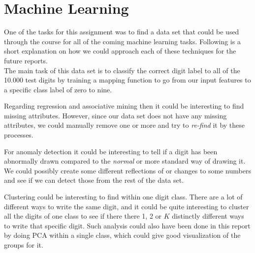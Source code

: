 \section{Machine Learning}


One of the tasks for this assignment was to find a data set that could be used through the course for all of the coming machine learning tasks. Following is a short explanation on how we could approach each of these techniques for the future reports. \\

The main task of this data set is to \textsf{classify} the correct digit label to all of the 10.000 test digits by training a mapping function to go from our input features to a specific class label of zero to nine. 

Regarding \textsf{regression} and \textsf{associative mining} then it could be interesting to find missing attributes. However, since our data set does not have any missing attributes, we could manually remove one or more and try to \emph{re-find} it by these processes. 

For \textsf{anomaly detection} it could be interesting to tell if a digit has been abnormally drawn compared to the \emph{normal} or more standard way of drawing it. We could possibly create some different reflections of or changes to some numbers and see if we can detect those from the rest of the data set. 

\textsf{Clustering} could be interesting to find within one digit class. There are a lot of different ways to write the same digit, and it could be quite interesting to cluster all the digits of one class to see if there there 1, 2 or $K$ distinctly different ways to write that specific digit. Such analysis could also have been done in this report by doing PCA within a single class, which could give good visualization of the groups for it. 

